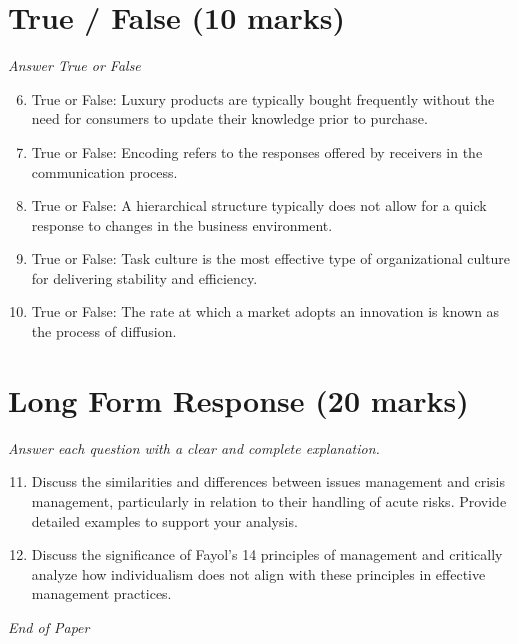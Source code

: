 \documentclass[12pt]{article}
\begin{document}
\section*{True / False (10 marks)}
\textit{Answer True or False}
\begin{enumerate}[label=\arabic*.]
\setcounter{enumi}{5}
\item True or False: Luxury products are typically bought frequently without the need for consumers to update their knowledge prior to purchase.
\item True or False: Encoding refers to the responses offered by receivers in the communication process.
\item True or False: A hierarchical structure typically does not allow for a quick response to changes in the business environment.
\item True or False: Task culture is the most effective type of organizational culture for delivering stability and efficiency.
\item True or False: The rate at which a market adopts an innovation is known as the process of diffusion.
\end{enumerate}

\section*{Long Form Response (20 marks)}
\textit{Answer each question with a clear and complete explanation.}
\begin{enumerate}[label=\arabic*.]
\setcounter{enumi}{10}
\item Discuss the similarities and differences between issues management and crisis management, particularly in relation to their handling of acute risks. Provide detailed examples to support your analysis.
\item Discuss the significance of Fayol's 14 principles of management and critically analyze how individualism does not align with these principles in effective management practices.
\end{enumerate}

\vfill
\noindent\textit{End of Paper}
\end{document}
